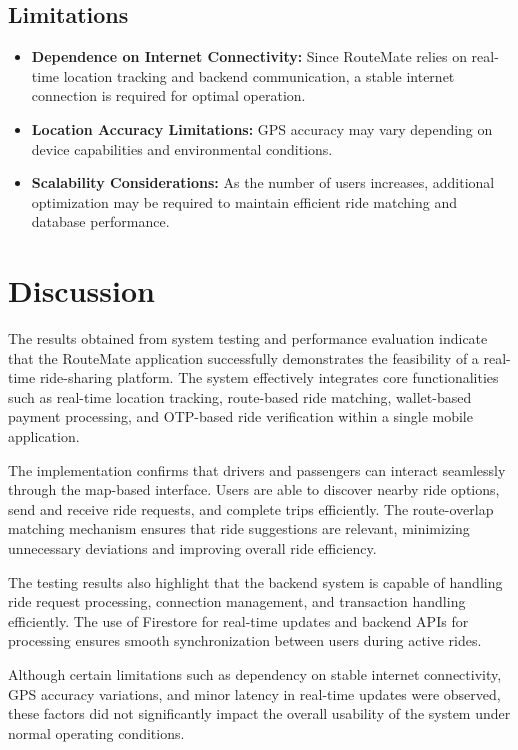 \documentclass[10pt,a4paper]{report}
\begin{document}
\subsection{Limitations}
\begin{itemize}
\item \textbf{Dependence on Internet Connectivity:} Since RouteMate relies on real-time location tracking and backend communication, a stable internet connection is required for optimal operation.

\item\textbf{Location Accuracy Limitations:} GPS accuracy may vary depending on device capabilities and environmental conditions.

\item\textbf{Scalability Considerations:} As the number of users increases, additional optimization may be required to maintain efficient ride matching and database performance.
\end{itemize}

\section{Discussion}

\justify\large The results obtained from system testing and performance evaluation indicate that the RouteMate application successfully demonstrates the feasibility of a real-time ride-sharing platform. The system effectively integrates core functionalities such as real-time location tracking, route-based ride matching, wallet-based payment processing, and OTP-based ride verification within a single mobile application.

\justify\large The implementation confirms that drivers and passengers can interact seamlessly through the map-based interface. Users are able to discover nearby ride options, send and receive ride requests, and complete trips efficiently. The route-overlap matching mechanism ensures that ride suggestions are relevant, minimizing unnecessary deviations and improving overall ride efficiency.

\justify\large The testing results also highlight that the backend system is capable of handling ride request processing, connection management, and transaction handling efficiently. The use of Firestore for real-time updates and backend APIs for processing ensures smooth synchronization between users during active rides.

\justify\large Although certain limitations such as dependency on stable internet connectivity, GPS accuracy variations, and minor latency in real-time updates were observed, these factors did not significantly impact the overall usability of the system under normal operating conditions.
\end{document}
